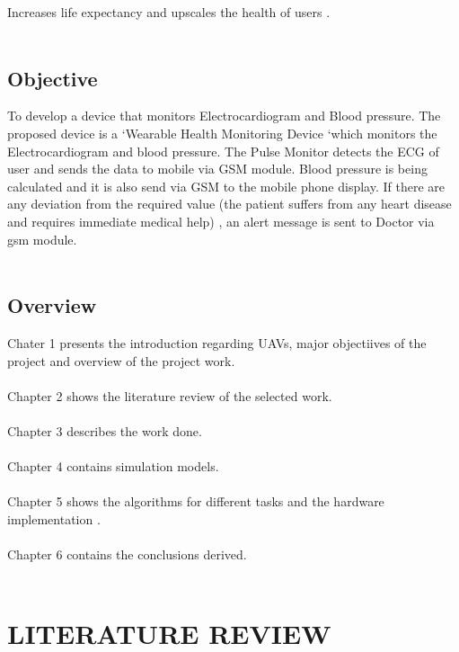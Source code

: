\documentclass[12pt,a4paper]{report}
\begin{document}
  	Increases life expectancy and upscales the health of users .\\\
  
 
 


\section{ Objective}


\hspace*{1cm}
To develop a device that monitors Electrocardiogram and Blood pressure.
The proposed device is a ‘Wearable Health Monitoring Device ‘which monitors the Electrocardiogram and blood pressure. The Pulse Monitor detects the ECG of user and sends the data to mobile via GSM
module.
Blood pressure is being calculated and it is also send via GSM to the mobile phone display. If there are any deviation from the required value (the patient suffers from any heart disease and requires immediate medical help) , an alert message is sent to Doctor via gsm module. \\\

\section{ Overview}

Chater 1 presents the introduction regarding UAVs, major objectiives of the project and overview of the project work.
\\\\
Chapter 2  shows the literature review of the selected work.
\\\\
Chapter 3  describes the  work done.
\\\\
Chapter 4  contains simulation models.
\\\\
Chapter 5  shows the algorithms  for different tasks and the hardware implementation .
\\\\
Chapter 6  contains the conclusions derived.
\\\\



\chapter{ LITERATURE REVIEW}
\end{document}
